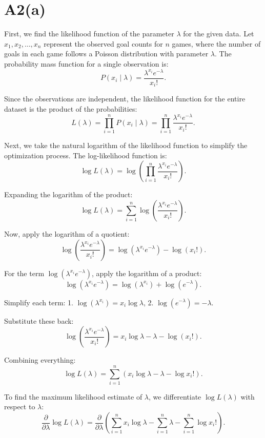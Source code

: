 \documentclass{article}
\begin{document}
\section*{A2(a)}

First, we find the likelihood function of the parameter \( \lambda \) for the given data. Let \( x_1, x_2, \dots, x_n \) represent the observed goal counts for \( n \) games, where the number of goals in each game follows a Poisson distribution with parameter \( \lambda \). The probability mass function for a single observation is:
\[
P(x_i \mid \lambda) = \frac{\lambda^{x_i} e^{-\lambda}}{x_i!}.
\]

Since the observations are independent, the likelihood function for the entire dataset is the product of the probabilities:
\[
L(\lambda) = \prod_{i=1}^n P(x_i \mid \lambda) = \prod_{i=1}^n \frac{\lambda^{x_i} e^{-\lambda}}{x_i!}.
\]

Next, we take the natural logarithm of the likelihood function to simplify the optimization process. The log-likelihood function is:
\[
\log L(\lambda) = \log \left( \prod_{i=1}^n \frac{\lambda^{x_i} e^{-\lambda}}{x_i!} \right).
\]

Expanding the logarithm of the product:
\[
\log L(\lambda) = \sum_{i=1}^n \log \left( \frac{\lambda^{x_i} e^{-\lambda}}{x_i!} \right).
\]

Now, apply the logarithm of a quotient:
\[
\log \left( \frac{\lambda^{x_i} e^{-\lambda}}{x_i!} \right) = \log \left( \lambda^{x_i} e^{-\lambda} \right) - \log(x_i!).
\]

For the term \( \log \left( \lambda^{x_i} e^{-\lambda} \right) \), apply the logarithm of a product:
\[
\log \left( \lambda^{x_i} e^{-\lambda} \right) = \log \left( \lambda^{x_i} \right) + \log \left( e^{-\lambda} \right).
\]

Simplify each term:
1. \( \log \left( \lambda^{x_i} \right) = x_i \log \lambda \),
2. \( \log \left( e^{-\lambda} \right) = -\lambda \).

Substitute these back:
\[
\log \left( \frac{\lambda^{x_i} e^{-\lambda}}{x_i!} \right) = x_i \log \lambda - \lambda - \log(x_i!).
\]

Combining everything:
\[
\log L(\lambda) = \sum_{i=1}^n \left( x_i \log \lambda - \lambda - \log x_i! \right).
\]

To find the maximum likelihood estimate of \( \lambda \), we differentiate \( \log L(\lambda) \) with respect to \( \lambda \):
\[
\frac{\partial}{\partial \lambda} \log L(\lambda) = \frac{\partial}{\partial \lambda} \left( \sum_{i=1}^n x_i \log \lambda - \sum_{i=1}^n \lambda - \sum_{i=1}^n \log x_i! \right).
\]
\end{document}
